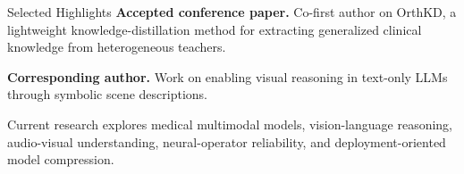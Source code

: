 \begin{rubric}{Selected Highlights}
\entry*[IJCAI 2026]
  \textbf{Accepted conference paper.} Co-first author on OrthKD, a lightweight knowledge-distillation method for extracting generalized clinical knowledge from heterogeneous teachers.

\entry*[IJCNN 2026]
  \textbf{Corresponding author.} Work on enabling visual reasoning in text-only LLMs through symbolic scene descriptions.

\entry*[Current]
  Current research explores medical multimodal models, vision-language reasoning, audio-visual understanding, neural-operator reliability, and deployment-oriented model compression.
\end{rubric}
